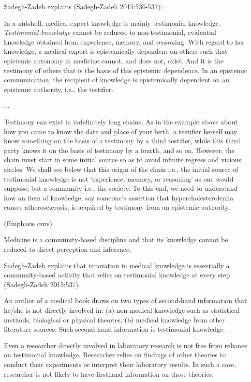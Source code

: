 Sadegh-Zadeh explains (Sadegh-Zadeh 2015:536-537):
\begin{myquote}
In a nutshell, medical expert knowledge is mainly testimonial knowledge.  {\sl Testimonial knowledge} cannot be reduced to non-testimonial, evidential knowledge obtained from experience, memory, and reasoning. With regard to her knowledge, a medical expert is epistemically dependent on others such that epistemic autonomy in medicine cannot, and does not, exist.  And it is the testimony of others that is the basis of this epistemic dependence. In an epistemic communication, the recipient of knowledge is epistemically dependent on an epistemic authority, i.e., the testifier.

...

Testimony can exist in indefinitely long chains. As in the example above about how you came to know the date and place of your birth, a testifier herself may know something on the basis of a testimony by a third testifier, while this third party knows it on the basis of testimony by a fourth, and so on.  However, the chain must start in some initial source so as to avoid infinite regress and vicious circles.  We shall see below that this origin of the chain i.e., the initial source of testimonial knowledge is not `experience, memory, or reasoning' as one would suppose, but a community i.e., the society.  To this end, we need to understand how an item of knowledge, say someone's assertion that hypercholesterolemia causes atherosclerosis, is acquired by testimony from an epistemic authority.  

\hfill (Emphasis ours)
\end{myquote}

Medicine is a community-based discipline and that its knowledge cannot be reduced to direct perception and inference. 

Sadegh-Zadeh explains that innovation in medical knowledge is essentially a community-based activity that relies on testimonial knowledge at every step (Sadegh-Zadeh 2015:537).

An author of a medical book draws on two types of second-hand information that he/she is not directly involved in: (a) non-medical knowledge such as statistical methods, biological or physical theories; (b) medical knowledge from other literature sources.  Such second-hand information is testimonial knowledge.

Even a researcher directly involved in laboratory research is not free from reliance on testimonial knowledge. Researcher relies on findings of other theories to conduct their experiments or interpret their laboratory results. In such a case, researcher is not likely to have firsthand information on those theories.

